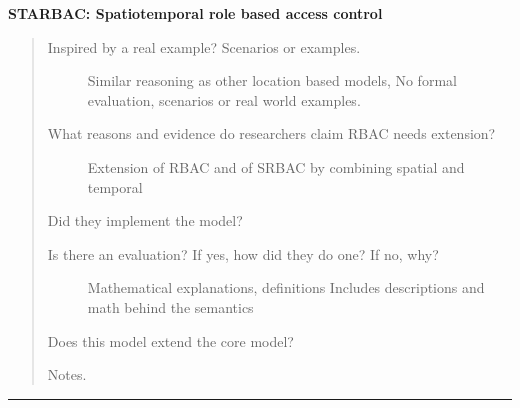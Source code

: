 \documentclass[letterpaper,10pt,english]{sphinxmanual}
\begin{document}
\textbf{STARBAC: Spatiotemporal role based access control}
\begin{quote}
\begin{description}
\item[{Inspired by a real example? Scenarios or examples.}] \leavevmode
Similar reasoning as other location based models, No formal evaluation, scenarios or real world examples.

\item[{What reasons and evidence do researchers claim RBAC needs extension?}] \leavevmode
Extension of RBAC and of SRBAC by combining spatial and temporal

\end{description}

Did they implement the model?
\begin{description}
\item[{Is there an evaluation? If yes, how did they do one? If no, why?}] \leavevmode
Mathematical explanations, definitions
Includes descriptions and math behind the semantics

\end{description}

Does this model extend the core model?

Notes.
\end{quote}


\bigskip\hrule{}\bigskip
\end{document}
